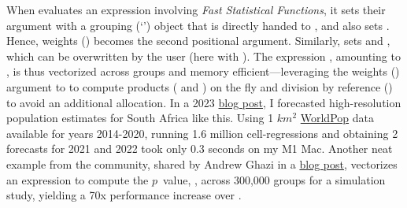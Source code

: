 \documentclass[nojss]{jss} %
\newcommand{\class}[1]{`\code{#1}'}
\newcommand{\fct}[1]{\code{#1()}}
\begin{document}
When \fct{fsummarise} evaluates an expression involving \emph{Fast Statistical Functions}, it sets their  argument with a grouping (\class{GRP}) object that is directly handed to , and also sets . Hence, weights () becomes the second positional argument. Similarly, \fct{fmutate} sets  and , which can be overwritten by the user (here with ). The expression , amounting to , is thus vectorized across groups and memory efficient---leveraging the weights () argument to \fct{fsum} to compute products ( and ) on the fly and division by reference (\code{\%/=\%}) to avoid an additional allocation. In a 2023 \href{https://sebkrantz.github.io/Rblog/2023/04/12/collapse-and-the-fastverse-reflecting-the-past-present-and-future/}{blog post}, I forecasted high-resolution population estimates for South Africa like this. Using 1 $km^2$ \href{https://www.worldpop.org/}{WorldPop} data available for years 2014-2020, running 1.6 million cell-regressions and obtaining 2 forecasts for 2021 and 2022 took only 0.3 seconds on my M1 Mac. Another neat example from the community, shared by Andrew Ghazi in a \href{https://andrewghazi.github.io/posts/collapse\_is\_sick/sick.html}{blog post}, vectorizes an expression to compute the $p$~value, , across 300,000 groups for a simulation study, yielding a 70x performance increase over . \newline
\end{document}
